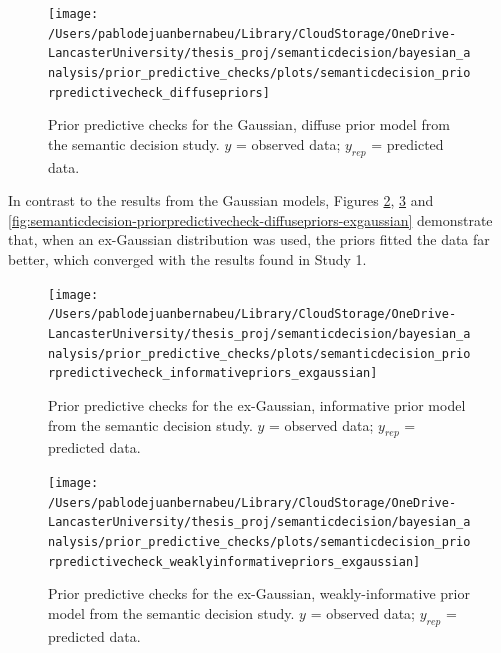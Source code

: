 \documentclass[
  12pt,
  man,floatsintext]{apa7}
\begin{document}
\begin{figure}

{\centering \texttt{[image: /Users/pablodejuanbernabeu/Library/CloudStorage/OneDrive-LancasterUniversity/thesis\_proj/semanticdecision/bayesian\_analysis/prior\_predictive\_checks/plots/semanticdecision\_priorpredictivecheck\_diffusepriors]} 

}

\caption{Prior predictive checks for the Gaussian, diffuse prior model from the semantic decision study. \(y\) = observed data; \(y_{rep}\) = predicted data.}\label{fig:semanticdecision-priorpredictivecheck-diffusepriors}
\end{figure}

In contrast to the results from the Gaussian models, Figures \ref{fig:semanticdecision-priorpredictivecheck-informativepriors-exgaussian}, \ref{fig:semanticdecision-priorpredictivecheck-weaklyinformativepriors-exgaussian} and \ref{fig:semanticdecision-priorpredictivecheck-diffusepriors-exgaussian} demonstrate that, when an ex-Gaussian distribution was used, the priors fitted the data far better, which converged with the results found in Study 1.



\begin{figure}

{\centering \texttt{[image: /Users/pablodejuanbernabeu/Library/CloudStorage/OneDrive-LancasterUniversity/thesis\_proj/semanticdecision/bayesian\_analysis/prior\_predictive\_checks/plots/semanticdecision\_priorpredictivecheck\_informativepriors\_exgaussian]} 

}

\caption{Prior predictive checks for the ex-Gaussian, informative prior model from the semantic decision study. \(y\) = observed data; \(y_{rep}\) = predicted data.}\label{fig:semanticdecision-priorpredictivecheck-informativepriors-exgaussian}
\end{figure}



\begin{figure}

{\centering \texttt{[image: /Users/pablodejuanbernabeu/Library/CloudStorage/OneDrive-LancasterUniversity/thesis\_proj/semanticdecision/bayesian\_analysis/prior\_predictive\_checks/plots/semanticdecision\_priorpredictivecheck\_weaklyinformativepriors\_exgaussian]} 

}

\caption{Prior predictive checks for the ex-Gaussian, weakly-informative prior model from the semantic decision study. \(y\) = observed data; \(y_{rep}\) = predicted data.}\label{fig:semanticdecision-priorpredictivecheck-weaklyinformativepriors-exgaussian}
\end{figure}
\end{document}
